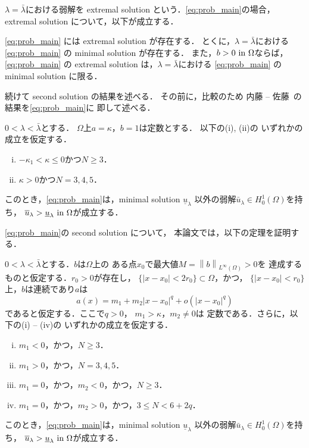 $\lambda = \bar{\lambda}$における弱解を
extremal solution という．\ref{eq:prob_main}の場合，
extremal solution について，以下が成立する．

\begin{thm} \label{thm:extremal_solution}
 \ref{eq:prob_main} には extremal solution が存在する．
 とくに，$\lambda = \bar{\lambda}$における
 \ref{eq:prob_main} の
 minimal solution が存在する．
 また，$b > 0 ~\text{in}~ \Omega$ならば，\ref{eq:prob_main} の 
 extremal solution は，$\lambda = \bar{\lambda}$における
 \ref{eq:prob_main} の
 minimal solution に限る．
\end{thm}

続けて second solution の結果を述べる．
その前に，比較のため
内藤 -- 佐藤~\cite{MR2886160}の結果を\ref{eq:prob_main}に
即して述べる．

\begin{thm}
 \label{thm:second_solution_naito_sato}
 $0 < \lambda < \bar{\lambda}$とする．
 $\Omega$上$a = \kappa$，$b = 1$は定数とする．
 以下の(i), (ii)の
 いずれかの成立を仮定する．
 \begin{enumerate}[(i)]
  \item $-\kappa_1 < \kappa \leq 0$かつ$N \geq 3$．
  \item $\kappa > 0$かつ$N = 3, 4, 5$．
 \end{enumerate}
 このとき，\ref{eq:prob_main}は，minimal solution
 $\underline{u}_\lambda$
 以外の弱解$\bar{u}_\lambda \in H_0^1(\Omega)$を持ち，
 $\overline{u}_\lambda >
 \underline{u}_\lambda ~\text{in}~ \Omega$が成立する．
\end{thm}

\ref{eq:prob_main}の second solution について，
本論文では，以下の定理を証明する．

\begin{thm} \label{thm:second_solution}
 $0 < \lambda < \bar{\lambda}$とする．$b$は$\Omega$上の
 ある点$x_0$で最大値$M = \left\| b \right\|_{L^\infty(\Omega)} > 0$を
 達成するものと仮定する．$r_0 > 0$が存在し，
 $\{ \lvert x - x_0 \rvert < 2r_0 \} \subset \Omega$，かつ，
 $\{ \lvert x - x_0 \rvert < r_0 \}$上，$b$は連続であり$a$は
 \begin{equation}
  a(x) = m_1 + m_2 \lvert x-x_0 \rvert^{q} 
  + o(\lvert x-x_0 \rvert^{q}) \label{eq:a_q}
 \end{equation}
 であると仮定する．ここで$q > 0$，
 $m_1 > \kappa$，$m_2 \neq 0$は
 定数である．さらに，以下の(i) -- (iv)の
 いずれかの成立を仮定する．
 \begin{enumerate}[(i)]
  \item $m_1 < 0$，かつ，$N \geq 3$．
  \item $m_1 > 0$，かつ，$N = 3, 4, 5$．
  \item $m_1 = 0$，かつ，$m_2 < 0$，かつ，$N \geq 3$．
  \item $m_1 = 0$，かつ，$m_2 > 0$，かつ，$3 \leq N < 6 + 2q$．
 \end{enumerate}
 このとき，\ref{eq:prob_main}は，minimal solution
 $\underline{u}_\lambda$
 以外の弱解$\bar{u}_\lambda \in H_0^1(\Omega)$を持ち，
 $\overline{u}_\lambda >
 \underline{u}_\lambda ~\text{in}~ \Omega$が成立する．
\end{thm}


